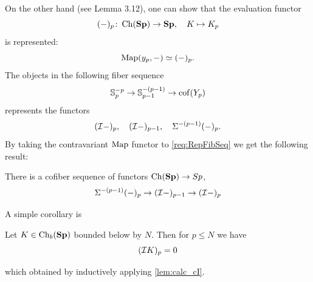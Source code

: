 On the other hand (see \cite{Ari21} Lemma 3.12), one can show that the evaluation functor
\begin{equation*}
    (-)_p \colon \operatorname{Ch}(\mathbf{Sp}) \to \mathbf{Sp}, \quad K \mapsto K_p
\end{equation*}
is represented:
\begin{equation*}
    \operatorname{Map}(y_p, -) \simeq (-)_p.
\end{equation*}
The objects in the following fiber sequence
\begin{equation}\label{req:RepFibSeq}
    \mathbb{S}^{-p}_{p} \to \mathbb{S}^{-(p-1)}_{p-1} \to \operatorname{cof}(Y_p)
\end{equation}
represents the functors
\begin{equation*}
    (\mathcal{I} -)_p, \quad (\mathcal{I} -)_{p-1}, \quad \Sigma^{-(p-1)} (-)_p.
\end{equation*}
By taking the contravariant $\operatorname{Map}$ functor to \cref{req:RepFibSeq} we get the following result:
\begin{lem}\label{lem:calc_cI}
    There is a cofiber sequence of functors $\operatorname{Ch}(\mathbf{Sp}) \to Sp$,
    \begin{equation}
        \Sigma^{-(p-1)} (-)_p \to (\mathcal{I} -)_{p-1} \to (\mathcal{I} -)_p
    \end{equation}
\end{lem}
A simple corollary is
\begin{cor}
    Let $K \in \operatorname{Ch}_b(\mathbf{Sp})$ bounded below by $N$. Then for $p \le N$ we have
    \begin{equation*}
        (\mathcal{I} K)_p = 0
    \end{equation*}
\end{cor}
which obtained by inductively applying \cref{lem:calc_cI}.


